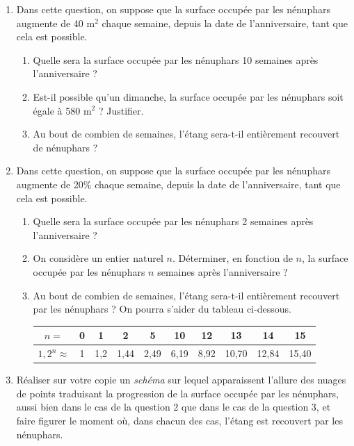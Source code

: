 \begin{enumerate}[resume]
\item Dans cette question, on suppose que la surface occupée par les nénuphars augmente de 40 m$^2$ chaque semaine, depuis la date de l'anniversaire, tant que cela est possible.
\begin{enumerate}
\item Quelle sera la surface occupée par les nénuphars 10 semaines après l'anniversaire ?
\item Est-il possible qu'un dimanche, la surface occupée par les nénuphars soit égale à 580 m$^2$ ? Justifier.
\item Au bout de combien de semaines, l'étang sera-t-il entièrement recouvert de nénuphars ?
\end{enumerate}

\item Dans cette question, on suppose que la surface occupée par les nénuphars augmente de 20\% chaque semaine, depuis la date de l'anniversaire, tant que cela est possible.
\begin{enumerate}
\item Quelle sera la surface occupée par les nénuphars 2 semaines après l'anniversaire ?
\item On considère un entier naturel $n$. Déterminer, en fonction de $n$, la surface occupée par les nénuphars $n$ semaines après l'anniversaire ?
\item Au bout de combien de semaines, l'étang sera-t-il entièrement recouvert par les nénuphars ? On pourra s'aider du tableau ci-dessous.

\begin{center}
\begin{tabular}{|c|c|c|c|c|c|c|c|c|c|}
\hline
$n = $ & 0 & 1 & 2 & 5 & 10 & 12 & 13 & 14 & 15 \\
\hline
$1,2^n \approx $ & 1 & 1,2 & 1,44 & 2,49 & 6,19 & 8,92 & 10,70 & 12,84 & 15,40 \\
\hline
\end{tabular}
\end{center}
\end{enumerate}

\item Réaliser sur votre copie un \textit{schéma} sur lequel apparaissent l'allure des nuages de points traduisant la progression de la surface occupée par les nénuphars, aussi bien dans le cas de la question 2 que dans le cas de la question 3, et faire figurer le moment où, dans chacun des cas, l'étang est recouvert par les nénuphars.
\end{enumerate}
